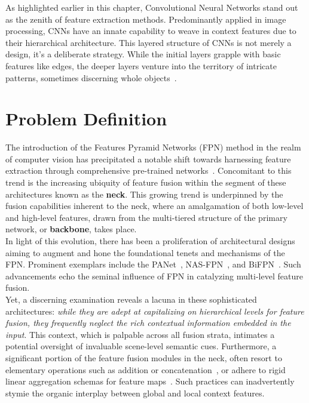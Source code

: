 As highlighted earlier in this chapter, Convolutional Neural Networks stand out as the zenith of feature extraction methods. Predominantly applied in image processing, CNNs have an innate capability to weave in context features due to their hierarchical architecture. This layered structure of CNNs is not merely a design, it's a deliberate strategy. While the initial layers grapple with basic features like edges, the deeper layers venture into the territory of intricate patterns, sometimes discerning whole objects~\cite{DBLP:journals/corr/ZeilerF13}.

\section{Problem Definition}
The introduction of the Features Pyramid Networks (FPN) method in the realm of computer vision has precipitated a notable shift towards harnessing feature extraction through comprehensive pre-trained networks~\cite{Lin_2017_CVPR}. Concomitant to this trend is the increasing ubiquity of feature fusion within the segment of these architectures known as the \textbf{neck}. This growing trend is underpinned by the fusion capabilities inherent to the neck, where an amalgamation of both low-level and high-level features, drawn from the multi-tiered structure of the primary network, or \textbf{backbone}, takes place.\\

In light of this evolution, there has been a proliferation of architectural designs aiming to augment and hone the foundational tenets and mechanisms of the FPN. Prominent exemplars include the PANet~\cite{DBLP:journals/corr/abs-1803-01534}, NAS-FPN~\cite{DBLP:journals/corr/abs-1904-07392}, and BiFPN~\cite{DBLP:journals/corr/abs-1911-09070}. Such advancements echo the seminal influence of FPN in catalyzing multi-level feature fusion.\\

Yet, a discerning examination reveals a lacuna in these sophisticated architectures: \textit{while they are adept at capitalizing on hierarchical levels for feature fusion, they frequently neglect the rich contextual information embedded in the input}. This context, which is palpable across all fusion strata, intimates a potential oversight of invaluable scene-level semantic cues. Furthermore, a significant portion of the feature fusion modules in the neck, often resort to elementary operations such as addition or concatenation~\cite{Lin_2017_CVPR,DBLP:journals/corr/abs-1803-01534}, or adhere to rigid linear aggregation schemas for feature maps~\cite{DBLP:journals/corr/abs-1904-07392, DBLP:journals/corr/abs-1911-09070}. Such practices can inadvertently stymie the organic interplay between global and local context features.\\

